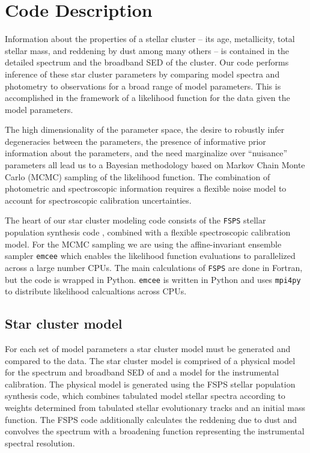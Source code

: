 \documentclass[11pt,preprint]{aastex}
\begin{document}
\section{Code Description}

Information about the properties of a stellar cluster -- its age,
metallicity, total stellar mass, and reddening by dust among many
others -- is contained in the detailed spectrum and the broadband SED
of the cluster. Our code performs inference of these star cluster
parameters by comparing model spectra and photometry to observations
for a broad range of model parameters.  This is accomplished in the
framework of a likelihood function for the data given the model
parameters.  

The high dimensionality of the parameter space, the desire to robustly
infer degeneracies between the parameters, the presence of informative
prior information about the parameters, and the need marginalize over
``nuisance'' parameters all lead us to a Bayesian methodology based on
Markov Chain Monte Carlo (MCMC) sampling of the likelihood
function. The combination of photometric and spectroscopic information
requires a flexible noise model to account for spectroscopic
calibration uncertainties.

The heart of our star cluster modeling code consists of the
\texttt{FSPS} stellar population synthesis code \citep{fsps}, combined
with a flexible spectroscopic calibration model.  For the MCMC
sampling we are using the affine-invariant ensemble sampler
\texttt{emcee} \citep{emcee} which enables the likelihood function
evaluations to parallelized across a large number CPUs. The main
calculations of \texttt{FSPS} are done in Fortran, but the code is
wrapped in Python.  \texttt{emcee} is written in Python and uses
\texttt{mpi4py} to distribute likelihood calcualtions across CPUs.

\subsection{Star cluster model}
For each set of model parameters a star cluster model must be
generated and compared to the data. The star cluster model is
comprised of a physical model for the spectrum and broadband SED of
and a model for the instrumental calibration.  The physical model is
generated using the FSPS stellar population synthesis code, which
combines tabulated model stellar spectra according to weights
determined from tabulated stellar evolutionary tracks and an initial
mass function.  The FSPS code additionally calculates the reddening
due to dust and convolves the spectrum with a broadening function
representing the instrumental spectral resolution.
\end{document}
